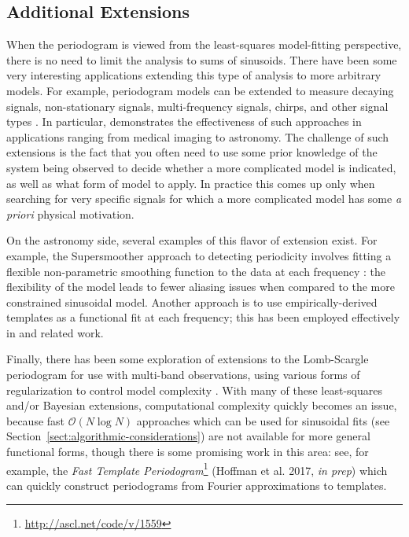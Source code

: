 \documentclass[preprint]{aastex}
\newcommand{\Sect}[1]{Section~\ref{sect:#1}}
\newcommand{\sect}[1]{\Sect{#1}}
\begin{document}
\subsection{Additional Extensions}
When the periodogram is viewed from the least-squares model-fitting perspective,
there is no need to limit the analysis to sums of sinusoids.
There have been some very interesting applications extending this type of
analysis to more arbitrary models.
For example, periodogram models can be extended to measure
decaying signals, non-stationary signals, multi-frequency signals, chirps,
and other signal types \citep[see, e.g.][]{Jaynes87, Bretthorst88, Gregory2001}.
In particular, \citet{Bretthorst88} demonstrates the effectiveness of such
approaches in applications ranging from medical imaging to astronomy.
The challenge of such extensions is the fact that you often need to use some
prior knowledge of the system being observed to decide whether a more
complicated model is indicated, as well as what form of model to apply.
In practice this comes up only when searching for very specific signals for
which a more complicated model has some {\it a priori} physical motivation.

On the astronomy side, several examples of this flavor of extension exist.
For example, the Supersmoother approach to detecting periodicity
involves fitting a flexible non-parametric smoothing
function to the data at each frequency \citep{Reimann94}: the flexibility
of the model leads to fewer aliasing issues when compared to the more
constrained sinusoidal model.
Another approach is to use empirically-derived templates as a functional fit
at each frequency; this has been employed effectively in \citet{Sesar2010,
Sesar2013} and related work.

Finally, there has been some exploration of extensions to the Lomb-Scargle
periodogram for use with multi-band observations, using various forms of
regularization to control model complexity \citep{VanderPlas2015, Long2016}.
With many of these least-squares and/or Bayesian extensions,
computational complexity quickly becomes an issue, because fast
$\mathcal{O}(N\log N)$ approaches which can be used for sinusoidal fits
(see \sect{algorithmic-considerations}) are not available for more general
functional forms, though there is some promising work in this area: see,
for example, the {\it Fast Template Periodogram}\footnote{\url{http://ascl.net/code/v/1559}}
(Hoffman et al. 2017, {\it in prep})
which can quickly construct periodograms from Fourier approximations to templates.
\end{document}
